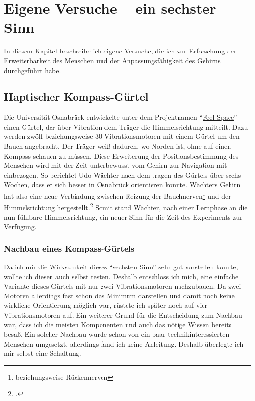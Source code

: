 \section{Eigene Versuche -- ein sechster Sinn}
\label{sec:Robin:experiments}
In diesem Kapitel beschreibe ich eigene Versuche, die ich zur Erforschung der Erweiterbarkeit
des Menschen und der Anpassungsfähigkeit des Gehirns durchgeführt habe.


\newcommand{\Linkfeelspace}%
{\enquote{\href{http://feelspace.cogsci.uni-osnabrueck.de/}{Feel Space}}}
\subsection{Haptischer Kompass-Gürtel}
Die Universität Osnabrück entwickelte unter dem Projektnamen \Linkfeelspace{}
einen Gürtel, der über Vibration dem Träger die Himmelsrichtung mitteilt.
Dazu werden zwölf beziehungsweise 30 Vibrationsmotoren mit einem Gürtel um den Bauch angebracht.
Der Träger weiß dadurch, wo Norden ist,
ohne auf einen Kompass schauen zu müssen. Diese Erweiterung der Positionsbestimmung des Menschen
wird mit der Zeit unterbewusst vom Gehirn zur Navigation mit einbezogen. So berichtet Udo Wächter
nach dem tragen des Gürtels über sechs Wochen, dass er sich besser in Osnabrück orientieren konnte.
Wächters Gehirn hat also eine neue Verbindung zwischen Reizung der
Bauchnerven\footnote{beziehungsweise Rückennerven} und der
Himmelsrichtung hergestellt.\footcite{noz:compass_belt}
Somit stand Wächter, nach einer Lernphase an die nun fühlbare Himmelsrichtung, ein neuer
Sinn für die Zeit des Experiments zur Verfügung.

\subsubsection{Nachbau eines Kompass-Gürtels}
\label{sec:Robin:experiments:myCompassBelt}
Da ich mir die Wirksamkeit dieses \enquote{sechsten Sinn} sehr gut vorstellen konnte, wollte
ich diesen auch selbst testen. Deshalb entschloss ich mich, eine einfache Variante dieses Gürtels
mit nur zwei Vibrationsmotoren nachzubauen. Da zwei Motoren allerdings fast schon das Minimum
darstellen und
damit noch keine wirkliche Orientierung möglich war, rüstete ich später noch auf vier Vibrationsmotoren
auf.
Ein weiterer Grund für die Entscheidung zum Nachbau war,
dass ich die meisten Komponenten und auch das nötige Wissen bereits besaß. Ein solcher Nachbau wurde
schon von ein paar technikinteressierten Menschen umgesetzt, allerdings fand ich keine Anleitung.
Deshalb überlegte ich mir selbst eine Schaltung.

